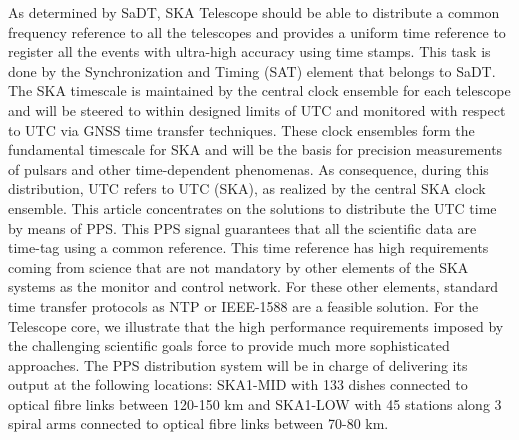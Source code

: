 As determined by SaDT, SKA Telescope should be able to distribute a common frequency reference to all the telescopes and provides a uniform time reference to register all the events with ultra-high accuracy using time stamps. This task is done by the Synchronization and Timing (SAT) element that belongs to SaDT. The SKA timescale is maintained by the central clock ensemble for each telescope and will be steered to within designed limits of UTC and monitored with respect to UTC via GNSS time transfer techniques. These clock ensembles form the fundamental timescale for SKA and will be the basis for precision measurements of pulsars and other time-dependent phenomenas. As consequence, during this distribution, UTC refers to UTC (SKA), as realized by the central SKA clock ensemble.
This article concentrates on the solutions to distribute the UTC time by means of PPS. This PPS signal guarantees that all the scientific data are time-tag using a common reference. This time reference has high requirements coming from science that are not mandatory by other elements of the SKA systems as the monitor and control network. For these other elements, standard time transfer protocols as NTP or IEEE-1588 are a feasible solution. For the Telescope core, we illustrate that the high performance requirements imposed by the challenging scientific goals force to provide much more sophisticated approaches. 
The PPS distribution system will be in charge of delivering its output at the following locations: SKA1-MID with 133 dishes connected to optical fibre links between 120-150 km and SKA1-LOW with 45 stations along 3 spiral arms connected to optical fibre links between 70-80 km.

